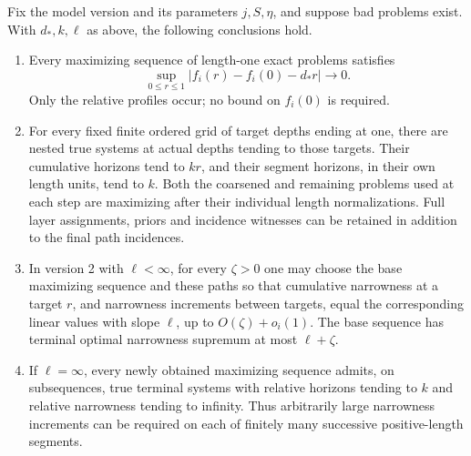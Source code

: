 \begin{proposition}\label{prop:critical-path}
Fix the model version and its parameters \(j,S,\eta\), and suppose bad
problems exist.  With \(d_*,k,\ell\) as above, the following conclusions
hold.
\begin{enumerate}
\item Every maximizing sequence of length-one exact problems satisfies
\begin{equation}
\sup_{0\le r\le1}
 \big|f_i(r)-f_i(0)-d_*r\big|\longrightarrow0 .
 \label{a03:linear-profile}
\end{equation}
Only the relative profiles occur; no bound on \(f_i(0)\) is required.
\item For every fixed finite ordered grid of target depths ending at one,
there are nested true systems at actual depths tending to those targets.
Their cumulative horizons tend to \(kr\), and their segment horizons,
in their own length units, tend to \(k\).  Both the coarsened and remaining
problems used at each step are maximizing after their individual length
normalizations.  Full layer assignments, priors and incidence witnesses
can be retained in addition to the final path incidences.
\item In version 2 with \(\ell<\infty\), for every \(\zeta>0\) one may
choose the base maximizing sequence and these paths so that cumulative
narrowness at a target \(r\), and narrowness increments between targets,
equal the corresponding linear values with slope \(\ell\), up to
\(O(\zeta)+o_i(1)\).  The base sequence has terminal optimal narrowness
supremum at most \(\ell+\zeta\).
\item If \(\ell=\infty\), every newly obtained maximizing sequence admits,
on subsequences, true terminal systems with relative horizons tending
to \(k\) and relative narrowness tending to infinity.  Thus arbitrarily
large narrowness increments can be required on each of finitely many
successive positive-length segments.
\end{enumerate}
\end{proposition}
